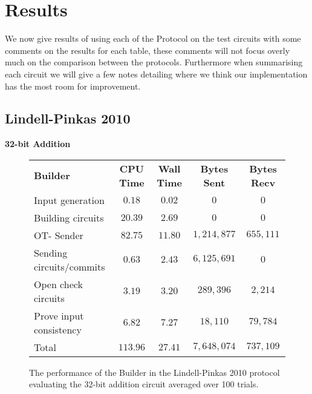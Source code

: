 \documentclass[ %
                    author={Nicholas Tutte},
                supervisor={Prof. Nigel Smart},
                    degree={MEng},
                     title={Secure Two Party Computation},
                  subtitle={A practical comparison of recent protocols},
                      type={Research - GG1K},
                      year={2015} ]{dissertation}
\begin{document}
		\section{Results}
			We now give results of using each of the Protocol on the test circuits with some comments on the results for each table, these comments will not focus overly much on the comparison between the protocols. Furthermore when summarising each circuit we will give a few notes detailing where we think our implementation has the most room for improvement.

			\FloatBarrier
			\subsection{Lindell-Pinkas 2010}

				\FloatBarrier
				\noindent \textbf{32-bit Addition}
				\begin{figure}[!ht]
					\begin{tabular}{| p{4.3cm} | c c c c |}
						\hline
						\textbf{Builder} & \textbf{CPU Time} & \textbf{Wall Time} & \textbf{Bytes Sent} & \textbf{Bytes Recv} \\
						\thickhline
						Input generation & $0.18$ & $0.02$ & $0$ & $0$ \\
						\hline
						Building circuits & $20.39$ & $2.69$ & $0$ & $0$ \\
						\hline
						OT- Sender & $82.75$ & $11.80$ & $1,214,877$ & $655,111$ \\
						\hline
						Sending circuits/commits & $0.63$ & $2.43$ & $6,125,691$ & $0$ \\
						\hline
						Open check circuits & $3.19$ & $3.20$ & $289,396$ & $2,214$ \\
						\hline
						Prove input consistency & $6.82$ & $7.27$ & $18,110$ & $79,784$ \\
						\thickhline
						Total & $113.96$ & $27.41$ & $7,648,074$ & $737,109$ \\
						\hline
					\end{tabular}
					\caption{The performance of the Builder in the Lindell-Pinkas 2010 protocol evaluating the 32-bit addition circuit averaged over 100 trials. \label{table:LP_2010_Add_Builder}}
				\end{figure}
					
\end{document}
